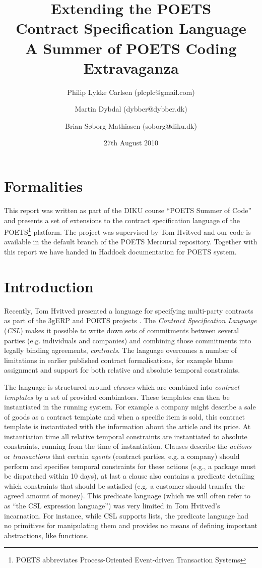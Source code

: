 \documentclass[10pt,a4paper,final,oneside,openany,article]{memoir}
\title{Extending the POETS \\ Contract Specification Language\\
       \vspace{0.1cm}
        \small{A Summer of POETS Coding Extravaganza}}
\author{Philip Lykke Carlsen (plcplc@gmail.com) \and
        Martin Dybdal (dybber@dybber.dk) \and
        Brian Søborg Mathiasen (soborg@diku.dk)}
\date{27th August 2010}
\begin{document}


\maketitle

\chapter{Formalities}
This report was written as part of the DIKU course ``POETS Summer of
Code'' and presents a set of extensions to the contract specification
language of the POETS\footnote{POETS abbreviates Process-Oriented
Event-driven Transaction Systems}
\cite{DBLP:journals/jlp/HengleinLSS09} platform. The project was
supervised by Tom Hvitved and our code is available in the default
branch of the POETS Mercurial repository. Together with this report we
have handed in Haddock documentation for POETS system.

\chapter{Introduction}

Recently, Tom Hvitved presented a language for specifying multi-party
contracts \cite{hvitved10} as part of the 3gERP and POETS projects
\cite{3gerp}. The \textit{Contract Specification Language}
(\textit{CSL}) makes it possible to write down sets of commitments
between several parties (e.g. individuals and companies) and combining
those commitments into legally binding agreements, \textit{contracts}.
The language overcomes a number of limitations in earlier published
contract formalisations, for example blame assignment and support for
both relative and absolute temporal constraints.

The language is structured around \textit{clauses} which are combined
into \textit{contract templates} by a set of provided
combinators. These templates can then be instantiated in the running
system. For example a company might describe a sale of goods as a
contract template and when a specific item is sold, this contract
template is instantiated with the information about the article and
its price. At instantiation time all relative temporal constraints are
instantiated to absolute constraints, running from the time of
instantiation. Clauses describe the \textit{actions} or
\textit{transactions} that certain \textit{agents} (contract parties,
e.g. a company) should perform and specifies temporal constraints for
these actions (e.g., a package must be dispatched within 10 days), at
last a clause also contains a predicate detailing which constraints
that should be satisfied (e.g. a customer should transfer the agreed
amount of money). This predicate language (which we will often refer
to as ``the CSL expression language'') was very limited in Tom
Hvitved's incarnation. For instance, while CSL supports lists, the
predicate language had no primitives for manipulating them and
provides no means of defining important abstractions, like functions.
\end{document}
